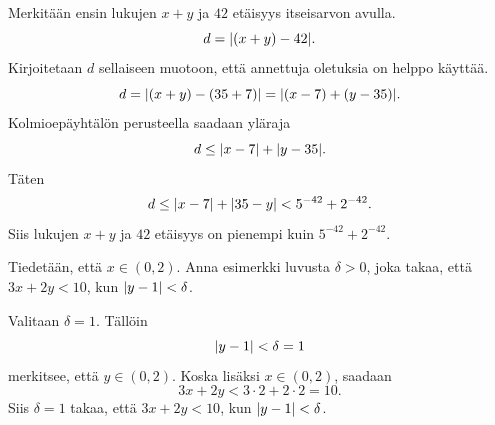 \documentclass[11pt,a4paper]{amsart}
\begin{document}
\begin{solution}
Merkitään ensin lukujen \(x + y\) ja \(42\) etäisyys itseisarvon avulla.
\[d = \lvert(x + y) - 42\rvert.\]
Kirjoitetaan \(d\) sellaiseen muotoon, että annettuja oletuksia on helppo
käyttää.
\[d = \lvert(x + y) - (35 + 7)\rvert = \lvert(x - 7) + (y - 35)\rvert.\]
Kolmioepäyhtälön perusteella saadaan yläraja
\[d \leq \lvert x - 7\rvert + \lvert y - 35\rvert.\]
Täten
\[d \leq \lvert x - 7\rvert + \lvert35 - y\rvert < 5^{-42} + 2^{-42}.\]
Siis lukujen \(x + y\) ja \(42\) etäisyys on pienempi kuin \(5^{-42}
+ 2^{-42}\).
\end{solution}

\begin{exercise}
Tiedetään, että \(x \in (0, 2)\). Anna esimerkki luvusta \(\delta > 0\), joka
takaa, että \(3x + 2y < 10\), kun \(\lvert y - 1\rvert < \delta\).
\end{exercise}

\begin{solution}
Valitaan \(\delta = 1\). Tällöin
\[\lvert y - 1\rvert < \delta = 1\]
merkitsee, että \(y \in (0, 2)\). Koska lisäksi \(x \in (0, 2)\), saadaan
\[3x + 2y < 3 \cdot 2 + 2 \cdot 2 = 10.\]
Siis \(\delta = 1\) takaa, että \(3x + 2y < 10\), kun \(\lvert y - 1\rvert < \delta\).
\end{solution}
\end{document}
